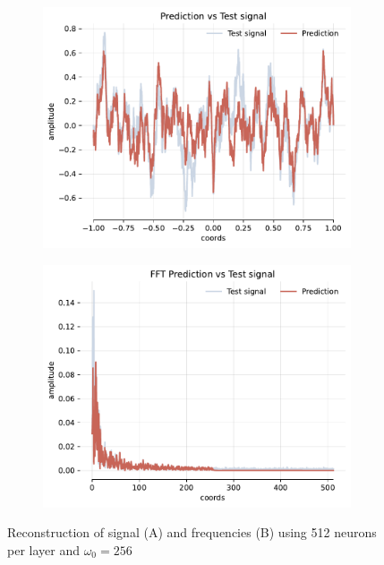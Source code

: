 \begin{figure}[h]
    \centering
    \begin{subfigure}[b]{0.40\textwidth}
        \centering
        \includegraphics[width=\textwidth]{img/ch3/pred-noise-h0-hf512-w256.pdf}
        \caption{}
    \end{subfigure}
    \begin{subfigure}[b]{0.40\textwidth}
        \centering
        \includegraphics[width=\textwidth]{img/ch3/fft-noise-h0-hf512-w256.pdf}
        \caption{}
    \end{subfigure}
    \caption{Reconstruction of signal (A) and frequencies (B) using 512 neurons per layer and $\omega_0=256$}
    \label{f:rec-noise-shallow-hf512-w256}
\end{figure}

